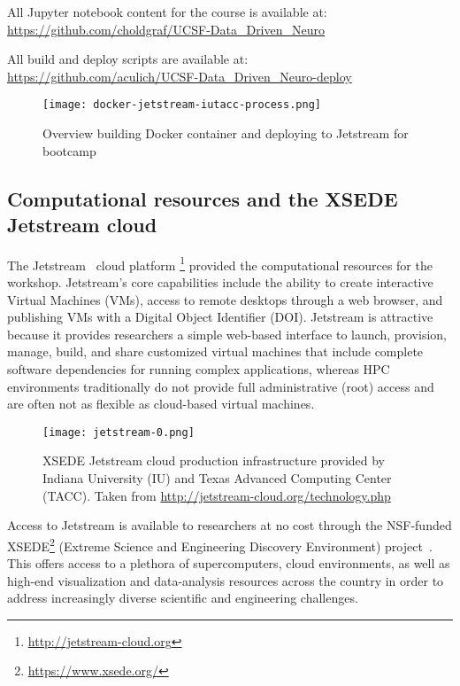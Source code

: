 All Jupyter notebook content for the course is available at:\\
\indent\indent\url{https://github.com/choldgraf/UCSF-Data_Driven_Neuro}

All build and deploy scripts are available at:\\
\indent\indent\url{https://github.com/aculich/UCSF-Data_Driven_Neuro-deploy}

\begin{figure}[h]
\centering
\texttt{[image: docker-jetstream-iutacc-process.png]}
\caption{Overview building Docker container and deploying to Jetstream for bootcamp}
\end{figure}

\subsection{Computational resources and the XSEDE Jetstream cloud}

The Jetstream~\cite{Stewart2015Jetstream} cloud platform
\footnote{\url{http://jetstream-cloud.org}} provided the computational resources for the
workshop. Jetstream's core capabilities include the ability to create
interactive Virtual Machines (VMs), access to remote desktops through a web
browser, and publishing VMs with a Digital Object Identifier (DOI). Jetstream is
attractive because it provides researchers a simple web-based
interface\cite{NiravCyberinfra2016} to launch, provision, manage, build, and
share customized virtual machines that include complete software dependencies
for running complex applications, whereas HPC environments traditionally do not
provide full administrative (root) access and are often not as flexible as
cloud-based virtual machines.

\begin{figure}[h]
\centering
\texttt{[image: jetstream-0.png]}
\caption{XSEDE Jetstream cloud production infrastructure provided by Indiana University (IU) and Texas Advanced Computing Center (TACC). Taken from \url{http://jetstream-cloud.org/technology.php}}
\end{figure}

Access to Jetstream is available to researchers at no cost through the
NSF-funded XSEDE\footnote{\url{https://www.xsede.org/}} (Extreme Science and
Engineering Discovery Environment) project~\cite{Towns2014XSEDE}. This
offers access to a plethora of supercomputers, cloud environments, as well as high-end
visualization and data-analysis resources across the
country in order to address increasingly diverse scientific and
engineering challenges.

